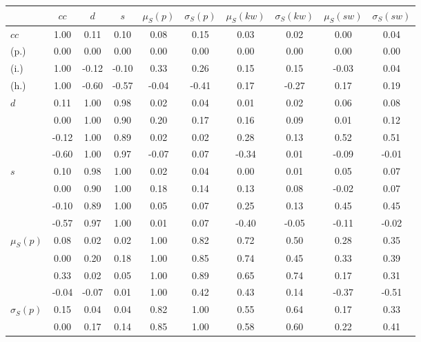 \begin{table*}[h!]
\begin{center}
\begin{tabular}{| l | c | c | c | c | c | c | c | c | c |}\hline
 & $cc$ & $d$ & $s$ & $\mu_S(p)$ & $\sigma_S(p)$ & $\mu_S(kw)$ & $\sigma_S(kw)$ & $\mu_S(sw)$ & $\sigma_S(sw)$ \\\hline
$cc$ & 1.00  & 0.11  & 0.10  & 0.08  & 0.15  & 0.03  & 0.02  & 0.00  & 0.04 \\\hline
(p.) & 0.00  & 0.00  & 0.00  & 0.00  & 0.00  & 0.00  & 0.00  & 0.00  & 0.00 \\\hline
(i.) & 1.00  & -0.12  & -0.10  & 0.33  & 0.26  & 0.15  & 0.15  & -0.03  & 0.04 \\\hline
(h.) & 1.00  & -0.60  & -0.57  & -0.04  & -0.41  & 0.17  & -0.27  & 0.17  & 0.19 \\\hline
$d$ & 0.11  & 1.00  & 0.98  & 0.02  & 0.04  & 0.01  & 0.02  & 0.06  & 0.08 \\\hline
 & 0.00  & 1.00  & 0.90  & 0.20  & 0.17  & 0.16  & 0.09  & 0.01  & 0.12 \\\hline
 & -0.12  & 1.00  & 0.89  & 0.02  & 0.02  & 0.28  & 0.13  & 0.52  & 0.51 \\\hline
 & -0.60  & 1.00  & 0.97  & -0.07  & 0.07  & -0.34  & 0.01  & -0.09  & -0.01 \\\hline
$s$ & 0.10  & 0.98  & 1.00  & 0.02  & 0.04  & 0.00  & 0.01  & 0.05  & 0.07 \\\hline
 & 0.00  & 0.90  & 1.00  & 0.18  & 0.14  & 0.13  & 0.08  & -0.02  & 0.07 \\\hline
 & -0.10  & 0.89  & 1.00  & 0.05  & 0.07  & 0.25  & 0.13  & 0.45  & 0.45 \\\hline
 & -0.57  & 0.97  & 1.00  & 0.01  & 0.07  & -0.40  & -0.05  & -0.11  & -0.02 \\\hline
$\mu_S(p)$ & 0.08  & 0.02  & 0.02  & 1.00  & 0.82  & 0.72  & 0.50  & 0.28  & 0.35 \\\hline
 & 0.00  & 0.20  & 0.18  & 1.00  & 0.85  & 0.74  & 0.45  & 0.33  & 0.39 \\\hline
 & 0.33  & 0.02  & 0.05  & 1.00  & 0.89  & 0.65  & 0.74  & 0.17  & 0.31 \\\hline
 & -0.04  & -0.07  & 0.01  & 1.00  & 0.42  & 0.43  & 0.14  & -0.37  & -0.51 \\\hline
$\sigma_S(p)$ & 0.15  & 0.04  & 0.04  & 0.82  & 1.00  & 0.55  & 0.64  & 0.17  & 0.33 \\\hline
 & 0.00  & 0.17  & 0.14  & 0.85  & 1.00  & 0.58  & 0.60  & 0.22  & 0.41 \\\hline

\end{tabular}
\end{center}
\end{table*}
